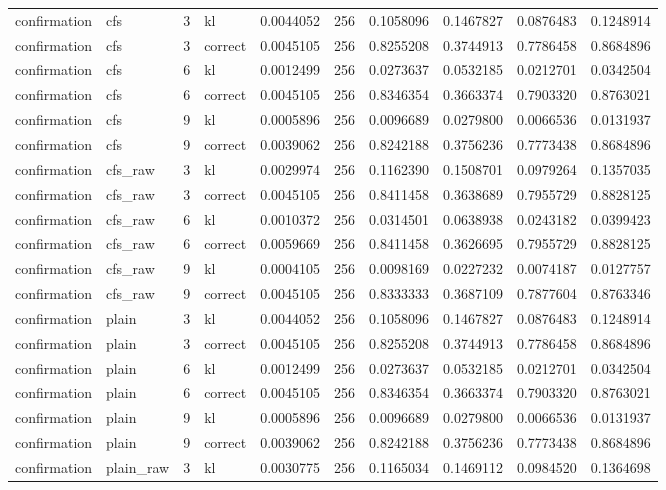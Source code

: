 \begin{tabular}{llrlrrrrrr}
confirmation & cfs & 3 & kl & 0.0044052 & 256 & 0.1058096 & 0.1467827 & 0.0876483 & 0.1248914 \\
confirmation & cfs & 3 & correct & 0.0045105 & 256 & 0.8255208 & 0.3744913 & 0.7786458 & 0.8684896 \\
confirmation & cfs & 6 & kl & 0.0012499 & 256 & 0.0273637 & 0.0532185 & 0.0212701 & 0.0342504 \\
confirmation & cfs & 6 & correct & 0.0045105 & 256 & 0.8346354 & 0.3663374 & 0.7903320 & 0.8763021 \\
confirmation & cfs & 9 & kl & 0.0005896 & 256 & 0.0096689 & 0.0279800 & 0.0066536 & 0.0131937 \\
confirmation & cfs & 9 & correct & 0.0039062 & 256 & 0.8242188 & 0.3756236 & 0.7773438 & 0.8684896 \\
confirmation & cfs_raw & 3 & kl & 0.0029974 & 256 & 0.1162390 & 0.1508701 & 0.0979264 & 0.1357035 \\
confirmation & cfs_raw & 3 & correct & 0.0045105 & 256 & 0.8411458 & 0.3638689 & 0.7955729 & 0.8828125 \\
confirmation & cfs_raw & 6 & kl & 0.0010372 & 256 & 0.0314501 & 0.0638938 & 0.0243182 & 0.0399423 \\
confirmation & cfs_raw & 6 & correct & 0.0059669 & 256 & 0.8411458 & 0.3626695 & 0.7955729 & 0.8828125 \\
confirmation & cfs_raw & 9 & kl & 0.0004105 & 256 & 0.0098169 & 0.0227232 & 0.0074187 & 0.0127757 \\
confirmation & cfs_raw & 9 & correct & 0.0045105 & 256 & 0.8333333 & 0.3687109 & 0.7877604 & 0.8763346 \\
confirmation & plain & 3 & kl & 0.0044052 & 256 & 0.1058096 & 0.1467827 & 0.0876483 & 0.1248914 \\
confirmation & plain & 3 & correct & 0.0045105 & 256 & 0.8255208 & 0.3744913 & 0.7786458 & 0.8684896 \\
confirmation & plain & 6 & kl & 0.0012499 & 256 & 0.0273637 & 0.0532185 & 0.0212701 & 0.0342504 \\
confirmation & plain & 6 & correct & 0.0045105 & 256 & 0.8346354 & 0.3663374 & 0.7903320 & 0.8763021 \\
confirmation & plain & 9 & kl & 0.0005896 & 256 & 0.0096689 & 0.0279800 & 0.0066536 & 0.0131937 \\
confirmation & plain & 9 & correct & 0.0039062 & 256 & 0.8242188 & 0.3756236 & 0.7773438 & 0.8684896 \\
confirmation & plain_raw & 3 & kl & 0.0030775 & 256 & 0.1165034 & 0.1469112 & 0.0984520 & 0.1364698 \\

\end{tabular}
